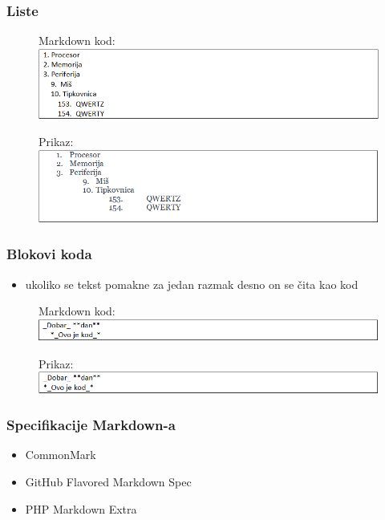 \documentclass{beamer}
\begin{document}
\newpage
\begin{frame}
\frametitle{Liste}
\begin{figure}
{Markdown kod:}
\includegraphics[width = 1.0\linewidth]{Numerirane_liste.png}
\end{figure}

\begin{figure}
{Prikaz:}
\includegraphics[width = 1.0\linewidth]{Numerirane_liste_prikaz.png}
\end{figure}
\end{frame}

\newpage
\begin{frame}
\frametitle{Blokovi koda}

\begin{itemize}
\item ukoliko se tekst pomakne za jedan razmak desno on se čita kao kod
\end{itemize}

\begin{figure}
{Markdown kod:}
\includegraphics[width = 1.0\linewidth]{Blokovi_koda.png}
\end{figure}

\begin{figure}
{Prikaz:}
\includegraphics[width = 1.0\linewidth]{Blokovi_koda_prikaz.png}
\end{figure}


\end{frame}

\newpage


\begin{frame}
\frametitle{Specifikacije Markdown-a}
\begin{itemize}
\item CommonMark
\item GitHub Flavored Markdown Spec
\item PHP Markdown Extra
\end{itemize}
\end{frame}
\end{document}
